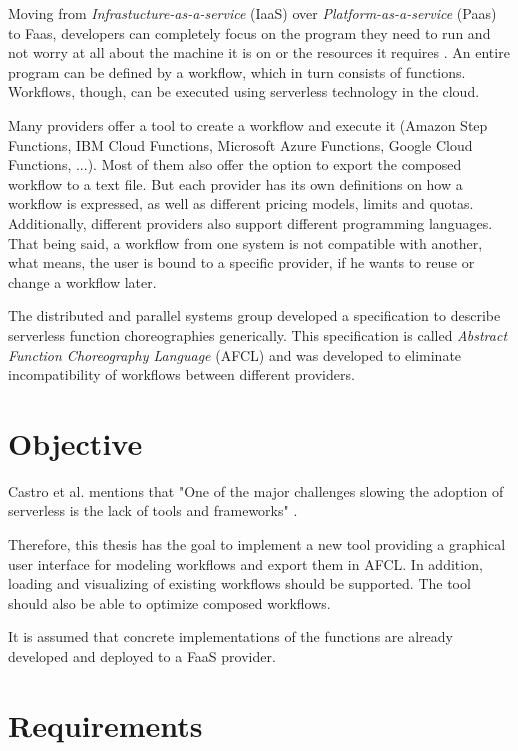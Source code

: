 \documentclass[a4paper,11pt,pdftex,halfparskip,cleardoubleempty,bibtotoc,liststotoc]{scrbook}
\begin{document}
Moving from \emph{Infrastucture-as-a-service} (IaaS) over \emph{Platform-as-a-service} (Paas) to Faas, developers can completely focus on the program they need to run and not worry at all about the machine it is on or the resources it requires \cite{articles-going-serverless-savage}.
An entire program can be defined by a workflow, which in turn consists of functions. Workflows, though, can be executed using serverless technology in the cloud.

Many providers offer a tool to create a workflow and execute it (Amazon Step Functions, IBM Cloud Functions, Microsoft Azure Functions, Google Cloud Functions, ...). Most of them also offer the option to export the composed workflow to a text file.
But each provider has its own definitions on how a workflow is expressed, as well as different pricing models, limits and quotas. Additionally, different providers also support different programming languages. That being said, a workflow from one system is not compatible with another, what means, the user is bound to a specific provider, if he wants to reuse or change a workflow later.

The distributed and parallel systems group developed a specification to describe serverless function choreographies generically. This specification is called \emph{Abstract Function Choreography Language} (AFCL) and was developed to eliminate incompatibility of workflows between different providers. 

\section{Objective}

Castro et al. mentions that "One of the major challenges slowing the adoption of serverless is the lack of tools and frameworks" \cite{articles-rise-of-serverless-castro}. 

Therefore, this thesis has the goal to implement a new tool providing a graphical user interface for modeling workflows and export them in AFCL. In addition, loading and visualizing of existing workflows should be supported.
The tool should also be able to optimize composed workflows.

It is assumed that concrete implementations of the functions are already developed and deployed to a FaaS provider.
  
\section{Requirements}
\end{document}
